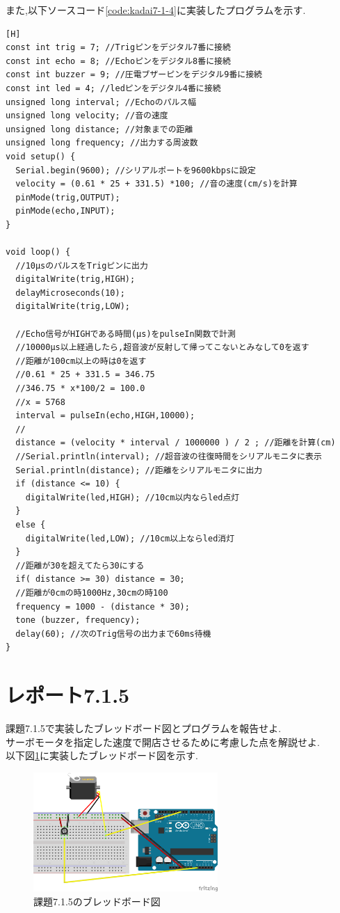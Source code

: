 \documentclass{jarticle}
\begin{document}
また,以下ソースコード\ref{code:kadai7-1-4}に実装したプログラムを示す.

\begin{lstlisting}[caption = 課題7.1.4,label=code:kadai7-1-4][H]
const int trig = 7; //Trigピンをデジタル7番に接続
const int echo = 8; //Echoピンをデジタル8番に接続
const int buzzer = 9; //圧電ブザーピンをデジタル9番に接続
const int led = 4; //ledピンをデジタル4番に接続
unsigned long interval; //Echoのパルス幅
unsigned long velocity; //音の速度
unsigned long distance; //対象までの距離
unsigned long frequency; //出力する周波数
void setup() {
  Serial.begin(9600); //シリアルポートを9600kbpsに設定
  velocity = (0.61 * 25 + 331.5) *100; //音の速度(cm/s)を計算
  pinMode(trig,OUTPUT);
  pinMode(echo,INPUT);
}

void loop() {
  //10μsのパルスをTrigピンに出力
  digitalWrite(trig,HIGH);
  delayMicroseconds(10);
  digitalWrite(trig,LOW);

  //Echo信号がHIGHである時間(μs)をpulseIn関数で計測
  //10000μs以上経過したら,超音波が反射して帰ってこないとみなして0を返す
  //距離が100cm以上の時は0を返す
  //0.61 * 25 + 331.5 = 346.75
  //346.75 * x*100/2 = 100.0
  //x = 5768 
  interval = pulseIn(echo,HIGH,10000); 
  //
  distance = (velocity * interval / 1000000 ) / 2 ; //距離を計算(cm)
  //Serial.println(interval); //超音波の往復時間をシリアルモニタに表示
  Serial.println(distance); //距離をシリアルモニタに出力
  if (distance <= 10) {
    digitalWrite(led,HIGH); //10cm以内ならled点灯
  }
  else {
    digitalWrite(led,LOW); //10cm以上ならled消灯
  }
  //距離が30を超えてたら30にする
  if( distance >= 30) distance = 30;
  //距離が0cmの時1000Hz,30cmの時100
  frequency = 1000 - (distance * 30); 
  tone (buzzer, frequency);
  delay(60); //次のTrig信号の出力まで60ms待機
}
\end{lstlisting}

\section{レポート7.1.5}
課題7.1.5で実装したブレッドボード図とプログラムを報告せよ. \\
サーボモータを指定した速度で開店させるために考慮した点を解説せよ. \\

以下図\ref{fig:kadai7-1-5}に実装したブレッドボード図を示す.

\begin{figure}[H]
\begin{center}
\includegraphics[width=7.0cm]{images/kadai7-1-5.png}
\caption{課題7.1.5のブレッドボード図}
\label{fig:kadai7-1-5}
\end{center}
\end{figure}
\end{document}
